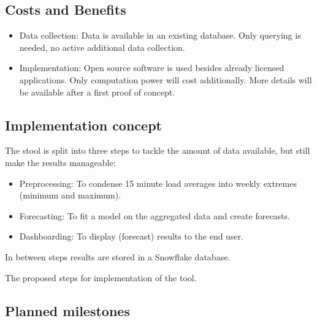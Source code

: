 \documentclass[letterpaper,10pt,english]{sphinxmanual}
\let\sphinxpxdimen\pdfpxdimen\else\newdimen\sphinxpxdimen
\begin{document}
\subsection{Costs and Benefits}
\label{\detokenize{business_understanding:costs-and-benefits}}\begin{itemize}
\item {} 
Data collection: Data is available in an existing database. Only querying is needed, no active additional data collection.

\item {} 
Implementation: Open source software is used besides already licensed applications. Only computation power will cost additionally. More details will be available after a first proof of concept.

\end{itemize}


\subsection{Implementation concept}
\label{\detokenize{business_understanding:implementation-concept}}
The stool is split into three steps to tackle the amount of data available, but still make the results manageable:
\begin{itemize}
\item {} 
Preprocessing: To condense 15 minute load averages into weekly extremes (minimum and maximum).

\item {} 
Forecasting: To fit a model on the aggregated data and create forecasts.

\item {} 
Dashboarding: To display (forecast) results to the end user.

\end{itemize}

In between steps results are stored in a Snowflake database.

\noindent{\hspace*{\fill}\sphinxincludegraphics[width=800\sphinxpxdimen]{{process_steps}.png}\hspace*{\fill}}

The proposed steps for implementation of the tool.


\subsection{Planned milestones}
\label{\detokenize{business_understanding:planned-milestones}}
\end{document}
